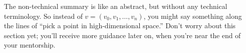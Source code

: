
The non-technical summary is like an abstract, but without any technical
terminology. So instead of $v = (v_0, v_1, \ldots, v_n)$, you might say
something along the lines of ``pick a point in high-dimensional space.''
Don't worry about this section yet; you'll receive more guidance
later on, when you're near the end of your mentorship.
